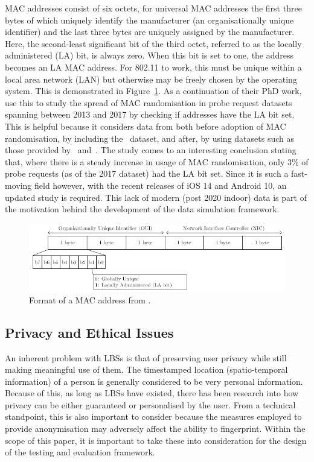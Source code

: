 MAC addresses consist of six octets, for universal MAC addresses the first three bytes of which uniquely identify the manufacturer (an organisationally unique identifier) and the last three bytes are uniquely assigned by the manufacturer.
Here, the second-least significant bit of the third octet, referred to as the locally administered (LA) bit, is always zero.
When this bit is set to one, the address becomes an LA MAC address.
For 802.11 to work, this must be unique within a local area network (LAN) but otherwise may be freely chosen by the operating system.
This is demonstrated in Figure~\ref{fig:mac-address}.
As a continuation of their PhD work,~ use this to study the spread of MAC randomisation in probe request datasets spanning between 2013 and 2017 by checking if addresses have the LA bit set.
This is helpful because it considers data from both before adoption of MAC randomisation, by including the~\cite{barbera2013crawdad} dataset, and after, by using datasets such as those provided by~\cite{Martin2017} and~\cite{robyns2017}.
The study comes to an interesting conclusion stating that, where there is a steady increase in usage of MAC randomisation, only 3\% of probe requests (as of the 2017 dataset) had the LA bit set.
Since it is such a fast-moving field however, with the recent releases of iOS 14 and Android 10, an updated study is required.
This lack of modern (post 2020 indoor) data is part of the motivation behind the development of the data simulation framework.

\begin{figure}[!ht]
    \centering
    \includegraphics[scale=0.6]{figures/macaddress.png}
    \caption{Format of a MAC address from \protect\cite{Matte2018}.}
    \label{fig:mac-address}
\end{figure}

\subsection{Privacy and Ethical Issues}\label{sec:privacy-issues}

An inherent problem with LBSs is that of preserving user privacy while still making meaningful use of them.
The timestamped location (spatio-temporal information) of a person is generally considered to be very personal information.
Because of this, as long as LBSs have existed, there has been research into how privacy can be either guaranteed or personalised by the user.
From a technical standpoint, this is also important to consider because the measures employed to provide anonymisation may adversely affect the ability to fingerprint.
Within the scope of this paper, it is important to take these into consideration for the design of the testing and evaluation framework.

